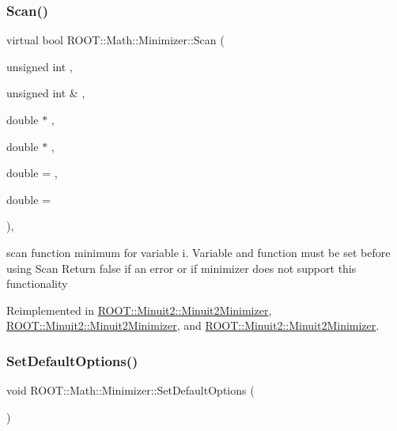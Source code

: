 \subsubsection{\texorpdfstring{Scan()}{Scan()}\hspace{0.1cm}{\footnotesize\ttfamily [3/3]}}
{\footnotesize\ttfamily virtual bool R\+O\+O\+T\+::\+Math\+::\+Minimizer\+::\+Scan (\begin{DoxyParamCaption}\item[{unsigned int}]{,  }\item[{unsigned int \&}]{,  }\item[{double $\ast$}]{,  }\item[{double $\ast$}]{,  }\item[{double}]{ = {},  }\item[{double}]{ = {} }\end{DoxyParamCaption})\hspace{0.3cm}{\ttfamily [inline]}, {\ttfamily [virtual]}}

scan function minimum for variable i. Variable and function must be set before using Scan Return false if an error or if minimizer does not support this functionality 

Reimplemented in \mbox{\hyperlink{classROOT_1_1Minuit2_1_1Minuit2Minimizer_a3f2f94c743a9b120a71da5ba23bd88cb}{R\+O\+O\+T\+::\+Minuit2\+::\+Minuit2\+Minimizer}}, \mbox{\hyperlink{classROOT_1_1Minuit2_1_1Minuit2Minimizer_a3f2f94c743a9b120a71da5ba23bd88cb}{R\+O\+O\+T\+::\+Minuit2\+::\+Minuit2\+Minimizer}}, and \mbox{\hyperlink{classROOT_1_1Minuit2_1_1Minuit2Minimizer_a3f2f94c743a9b120a71da5ba23bd88cb}{R\+O\+O\+T\+::\+Minuit2\+::\+Minuit2\+Minimizer}}.

\mbox{\label{classROOT_1_1Math_1_1Minimizer_a4811690d47537dbc0ab09d50d57ce34f}} 
\subsubsection{\texorpdfstring{SetDefaultOptions()}{SetDefaultOptions()}\hspace{0.1cm}{\footnotesize\ttfamily [1/3]}}
{\footnotesize\ttfamily void R\+O\+O\+T\+::\+Math\+::\+Minimizer\+::\+Set\+Default\+Options (\begin{DoxyParamCaption}{ }\end{DoxyParamCaption})\hspace{0.3cm}{\ttfamily [inline]}}



